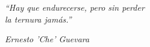\newpage

\vspace*{10cm}
\hspace{4cm}\begin{minipage}{.51\textwidth}

\textit{``Hay que endurecerse, pero sin perder \\la ternura jamás.'' }

\begin{flushright}\itshape Ernesto 'Che' Guevara
\upshape\end{flushright}

\end{minipage}
